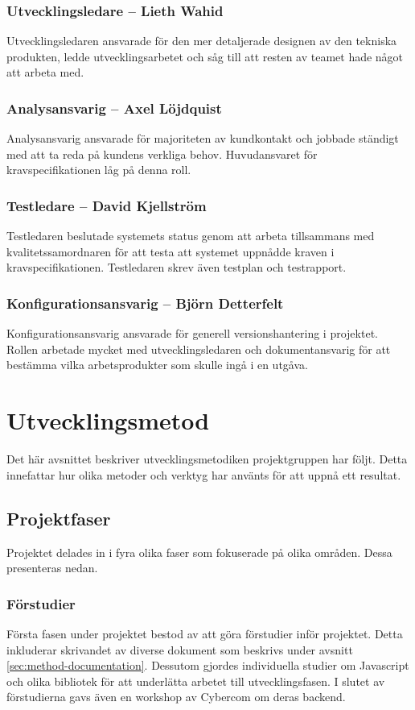 \subsubsection*{Utvecklingsledare -- Lieth Wahid}
Utvecklingsledaren ansvarade för den mer detaljerade designen av den tekniska produkten, ledde utvecklingsarbetet och såg till att resten av teamet hade något att arbeta med.

\subsubsection*{Analysansvarig -- Axel Löjdquist}
Analysansvarig ansvarade för majoriteten av kundkontakt och jobbade ständigt med att ta reda på kundens verkliga behov. Huvudansvaret för kravspecifikationen låg på denna roll.

\subsubsection*{Testledare -- David Kjellström}
Testledaren beslutade systemets status genom att arbeta tillsammans med kvalitetssamordnaren för att testa att systemet uppnådde kraven i kravspecifikationen. Testledaren skrev även testplan och testrapport.

\subsubsection*{Konfigurationsansvarig -- Björn Detterfelt}
Konfigurationsansvarig ansvarade för generell versionshantering i projektet. Rollen arbetade mycket med utvecklingsledaren och dokumentansvarig för att bestämma vilka arbetsprodukter som skulle ingå i en utgåva.

\section{Utvecklingsmetod}
Det här avsnittet beskriver utvecklingsmetodiken projektgruppen har följt. Detta innefattar hur olika metoder och verktyg har använts för att uppnå ett resultat.

\subsection{Projektfaser}
Projektet delades in i fyra olika faser som fokuserade på olika områden. Dessa presenteras nedan.

\subsubsection*{Förstudier}
Första fasen under projektet bestod av att göra förstudier inför projektet. Detta inkluderar skrivandet av diverse dokument som beskrivs under avsnitt \ref{sec:method-documentation}. Dessutom gjordes individuella studier om Javascript och olika bibliotek för att underlätta arbetet till utvecklingsfasen. I slutet av förstudierna gavs även en workshop av Cybercom om deras backend.

